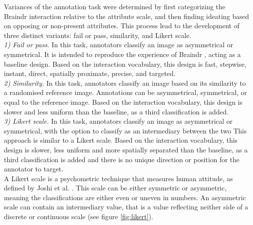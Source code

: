 \documentclass[../report.tex]{subfiles}
\begin{document}
Variances of the annotation task were determined by first categorizing the Braindr \cite{Braindr} interaction relative to the attribute scale, and then finding ideating based on opposing or non-present attributes. This process lead to the development of three distinct variants: fail or pass, similarity, and Likert scale. \\

\textit{1) Fail or pass.} In this task, annotators classify an image as asymmetrical or symmetrical. It is intended to reproduce the experience of Braindr \cite{Braindr}, acting as a baseline design. Based on the interaction vocabulary, this design is fast, stepwise, instant, direct, spatially proximate, precise, and targeted. \\

\textit{2) Similarity.} In this task, annotators classify an image based on its similarity to a randomised reference image. Annotations can be asymmetrical, symmetrical, or equal to the reference image. Based on the interaction vocabulary, this design is slower and less uniform than the baseline, as a third classification is added. \\

\textit{3) Likert scale.} In this task, annotators classify an image as asymmetrical or symmetrical, with the option to classify as an intermediary between the two This approach is similar to a Likert scale. Based on the interaction vocabulary, this design is slower, less uniform and more spatially separated than the baseline, as a third classification is added and there is no unique direction or position for the annotator to target. \\

A Likert scale is a psychometric technique that measures human attitude, as defined by Joshi et al. \cite{joshi2015likert}. This scale can be either symmetric or asymmetric, meaning the classifications are either even or uneven in numbers. An asymmetric scale can contain an intermediary value, that is a value reflecting neither side of a discrete or continuous scale (see figure \ref{fig:likert}).

\pagebreak
\end{document}
